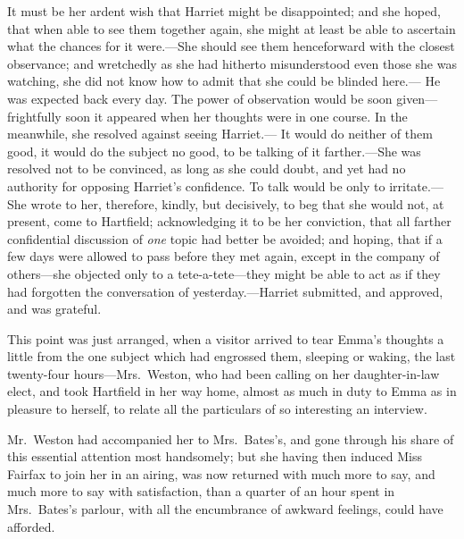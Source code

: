It must be her ardent wish that Harriet might be disappointed;
and she hoped, that when able to see them together again, she might at
least be able to ascertain what the chances for it were.---She should
see them henceforward with the closest observance; and wretchedly
as she had hitherto misunderstood even those she was watching,
she did not know how to admit that she could be blinded here.---%
He was expected back every day.  The power of observation would be
soon given---frightfully soon it appeared when her thoughts were in
one course.  In the meanwhile, she resolved against seeing Harriet.---%
It would do neither of them good, it would do the subject no good,
to be talking of it farther.---She was resolved not to be convinced,
as long as she could doubt, and yet had no authority for opposing
Harriet's confidence.  To talk would be only to irritate.---She wrote
to her, therefore, kindly, but decisively, to beg that she would not,
at present, come to Hartfield; acknowledging it to be her conviction,
that all farther confidential discussion of \emph{one} topic had better
be avoided; and hoping, that if a few days were allowed to pass before
they met again, except in the company of others---she objected only
to a tete-a-tete---they might be able to act as if they had forgotten
the conversation of yesterday.---Harriet submitted, and approved,
and was grateful.

This point was just arranged, when a visitor arrived to tear Emma's
thoughts a little from the one subject which had engrossed them,
sleeping or waking, the last twenty-four hours---Mrs.\ Weston, who had
been calling on her daughter-in-law elect, and took Hartfield in her
way home, almost as much in duty to Emma as in pleasure to herself,
to relate all the particulars of so interesting an interview.

Mr.\ Weston had accompanied her to Mrs.\ Bates's, and gone through his
share of this essential attention most handsomely; but she having
then induced Miss Fairfax to join her in an airing, was now returned
with much more to say, and much more to say with satisfaction,
than a quarter of an hour spent in Mrs.\ Bates's parlour, with all
the encumbrance of awkward feelings, could have afforded.

